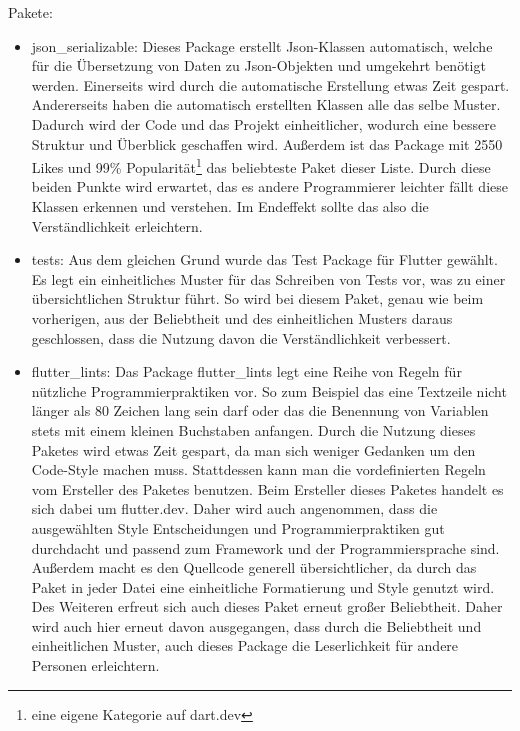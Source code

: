 \myNewSection
Pakete:
\begin{itemize}
	\item json\_serializable\cite{tech_packageJson}: Dieses Package erstellt Json-Klassen automatisch, welche für die Übersetzung von Daten zu Json-Objekten und umgekehrt benötigt werden. 
		Einerseits wird durch die automatische Erstellung etwas Zeit gespart. 
		Andererseits haben die automatisch erstellten Klassen alle das selbe Muster. Dadurch wird der Code und das Projekt einheitlicher, wodurch eine bessere Struktur und Überblick geschaffen wird.
		Außerdem ist das Package mit 2550 Likes und 99\% Popularität\footnote{eine eigene Kategorie auf dart.dev} das beliebteste Paket dieser Liste. Durch diese beiden Punkte wird erwartet, das es andere Programmierer leichter fällt diese Klassen erkennen und verstehen. Im Endeffekt sollte das also die Verständlichkeit erleichtern.
		 
	\item tests\cite{tech_packageTest}: Aus dem gleichen Grund wurde das Test Package für Flutter gewählt. Es legt ein einheitliches Muster für das Schreiben von Tests vor, was zu einer übersichtlichen Struktur führt. 
		So wird bei diesem Paket, genau wie beim vorherigen, aus der Beliebtheit und des einheitlichen Musters daraus geschlossen, dass die Nutzung davon die Verständlichkeit verbessert.
	\item flutter\_lints\cite{tech_packageLints}: Das Package flutter\_lints legt eine Reihe von Regeln für nützliche  Programmierpraktiken vor. So zum Beispiel das eine Textzeile nicht länger als 80 Zeichen lang sein darf oder das die Benennung von Variablen stets mit einem kleinen Buchstaben anfangen.
		Durch die Nutzung dieses Paketes wird etwas Zeit gespart, da man sich weniger Gedanken um den Code-Style machen muss. Stattdessen kann man die vordefinierten Regeln vom Ersteller des Paketes benutzen. Beim Ersteller dieses Paketes handelt es sich dabei um \glqq flutter.dev\grqq. Daher wird auch angenommen, dass die ausgewählten Style Entscheidungen und Programmierpraktiken gut durchdacht und passend zum Framework und der Programmiersprache sind. 
		Außerdem macht es den Quellcode generell übersichtlicher, da durch das Paket in jeder Datei eine einheitliche Formatierung und Style genutzt wird.
		Des Weiteren erfreut sich auch dieses Paket erneut großer Beliebtheit. Daher wird auch hier erneut davon ausgegangen, dass durch die Beliebtheit und einheitlichen Muster, auch dieses Package die Leserlichkeit für andere Personen erleichtern.
	

\end{itemize}
